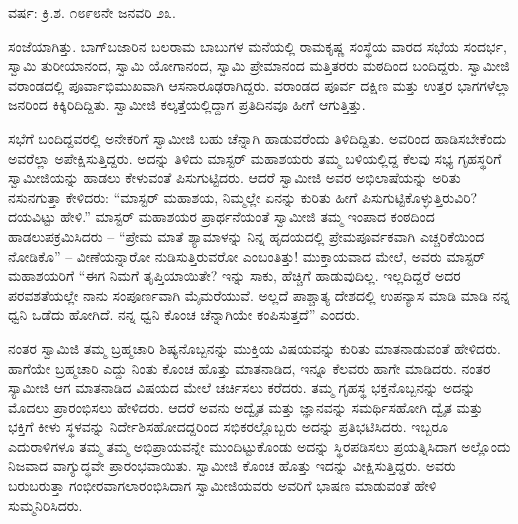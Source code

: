 \begin{center}
ವರ್ಷ: ಕ್ರಿ.ಶ. ೧೮೯೮ನೇ ಜನವರಿ ೨೩.
\end{center}

ಸಂಜೆಯಾಗಿತ್ತು. ಬಾಗ್‌ಬಜಾರಿನ ಬಲರಾಮ ಬಾಬುಗಳ ಮನೆಯಲ್ಲಿ ರಾಮಕೃಷ್ಣ ಸಂಸ್ಥೆಯ ವಾರದ ಸಭೆಯ ಸಂದರ್ಭ, ಸ್ವಾಮಿ ತುರೀಯಾನಂದ, ಸ್ವಾಮಿ ಯೋಗಾನಂದ, ಸ್ವಾಮಿ ಪ್ರೇಮಾನಂದ ಮತ್ತಿತರರು ಮಠದಿಂದ ಬಂದಿದ್ದರು. ಸ್ವಾಮೀಜಿ ವರಾಂಡದಲ್ಲಿ ಪೂರ್ವಾಭಿಮುಖವಾಗಿ ಆಸನಾರೂಢರಾಗಿದ್ದರು. ವರಾಂಡದ ಪೂರ್ವ ದಕ್ಷಿಣ ಮತ್ತು ಉತ್ತರ ಭಾಗಗಳೆಲ್ಲಾ ಜನರಿಂದ ಕಿಕ್ಕಿರಿದಿದ್ದಿತು. ಸ್ವಾಮೀಜಿ ಕಲ್ಕತ್ತೆಯಲ್ಲಿದ್ದಾಗ ಪ್ರತಿದಿನವೂ ಹೀಗೆ ಆಗುತ್ತಿತ್ತು.


ಸಭೆಗೆ ಬಂದಿದ್ದವರಲ್ಲಿ ಅನೇಕರಿಗೆ ಸ್ವಾಮೀಜಿ ಬಹು ಚೆನ್ನಾಗಿ ಹಾಡುವರೆಂದು ತಿಳಿದಿದ್ದಿತು. ಅವರಿಂದ ಹಾಡಿಸಬೇಕೆಂದು ಅವರೆಲ್ಲಾ ಅಪೇಕ್ಷಿಸುತ್ತಿದ್ದರು. ಅದನ್ನು ತಿಳಿದು ಮಾಸ್ಟರ್ ಮಹಾಶಯರು ತಮ್ಮ ಬಳಿಯಲ್ಲಿದ್ದ ಕೆಲವು ಸಭ್ಯ ಗೃಹಸ್ಥರಿಗೆ ಸ್ವಾಮೀಜಿಯನ್ನು ಹಾಡಲು ಕೇಳುವಂತೆ ಪಿಸುಗುಟ್ಟಿದರು. ಆದರೆ ಸ್ವಾಮೀಜಿ ಅವರ ಅಭಿಲಾಷೆಯನ್ನು ಅರಿತು ನಸುನಗುತ್ತಾ ಕೇಳಿದರು: “ಮಾಸ್ಟರ್ ಮಹಾಶಯ, ನಿಮ್ಮಲ್ಲೇ ಏನನ್ನು ಕುರಿತು ಹೀಗೆ ಪಿಸುಗುಟ್ಟಿಕೊಳ್ಳುತ್ತಿರುವಿರಿ? ದಯವಿಟ್ಟು ಹೇಳಿ.” ಮಾಸ್ಟರ್ ಮಹಾಶಯರ ಪ್ರಾರ್ಥನೆಯಂತೆ ಸ್ವಾಮೀಜಿ ತಮ್ಮ ಇಂಪಾದ ಕಂಠದಿಂದ ಹಾಡಲುಪಕ್ರಮಿಸಿದರು – “ಪ್ರೇಮ ಮಾತೆ ಶ್ಯಾಮಾಳನ್ನು ನಿನ್ನ ಹೃದಯದಲ್ಲಿ ಪ್ರೇಮಪೂರ್ವಕವಾಗಿ ಎಚ್ಚರಿಕೆಯಿಂದ ನೋಡಿಕೊ” – ವೀಣೆಯನ್ನಾರೋ ನುಡಿಸುತ್ತಿರುವರೋ ಎಂಬಂತಿತ್ತು! ಮುಕ್ತಾಯವಾದ ಮೇಲೆ, ಅವರು ಮಾಸ್ಟರ್ ಮಹಾಶಯರಿಗೆ “ಈಗ ನಿಮಗೆ ತೃಪ್ತಿಯಾಯಿತೇ? ಇನ್ನು ಸಾಕು, ಹೆಚ್ಚಿಗೆ ಹಾಡುವುದಿಲ್ಲ. ಇಲ್ಲದಿದ್ದರೆ ಅದರ ಪರವಶತೆಯಲ್ಲೇ ನಾನು ಸಂಪೂರ್ಣವಾಗಿ ಮೈಮರೆಯುವೆ. ಅಲ್ಲದೆ ಪಾಶ್ಚಾತ್ಯ ದೇಶದಲ್ಲಿ ಉಪನ್ಯಾಸ ಮಾಡಿ ಮಾಡಿ ನನ್ನ ಧ್ವನಿ ಒಡೆದು ಹೋಗಿದೆ. ನನ್ನ ಧ್ವನಿ ಕೊಂಚ ಚೆನ್ನಾಗಿಯೇ ಕಂಪಿಸುತ್ತದೆ” ಎಂದರು.

ನಂತರ ಸ್ವಾಮಿಜಿ ತಮ್ಮ ಬ್ರಹ್ಮಚಾರಿ ಶಿಷ್ಯನೊಬ್ಬನನ್ನು ಮುಕ್ತಿಯ ವಿಷಯವನ್ನು ಕುರಿತು ಮಾತನಾಡುವಂತೆ ಹೇಳಿದರು. ಹಾಗೆಯೇ ಬ್ರಹ್ಮಚಾರಿ ಎದ್ದು ನಿಂತು ಕೊಂಚ ಹೊತ್ತು ಮಾತನಾಡಿದ, ಇನ್ನೂ ಕೆಲವರು ಹಾಗೇ ಮಾಡಿದರು. ನಂತರ ಸ್ಯಾಮೀಜಿ ಆಗ ಮಾತನಾಡಿದ ವಿಷಯದ ಮೇಲೆ ಚರ್ಚಿಸಲು ಕರೆದರು. ತಮ್ಮ ಗೃಹಸ್ಥ ಭಕ್ತನೊಬ್ಬನನ್ನು ಅದನ್ನು ಮೊದಲು ಪ್ರಾರಂಭಿಸಲು ಹೇಳಿದರು. ಆದರೆ ಅವನು ಅದ್ವೈತ ಮತ್ತು ಜ್ಞಾನವನ್ನು ಸಮರ್ಥಿಸಹೋಗಿ ದ್ವೈತ ಮತ್ತು ಭಕ್ತಿಗೆ ಕೀಳು ಸ್ಥಳವನ್ನು ನಿರ್ದೇಶಿಸಹೋದದ್ದರಿಂದ ಸಭಿಕರಲ್ಲೊಬ್ಬರು ಅದನ್ನು ಪ್ರತಿಭಟಿಸಿದರು. ಇಬ್ಬರೂ ಎದುರಾಳಿಗಳೂ ತಮ್ಮ ತಮ್ಮ ಅಭಿಪ್ರಾಯವನ್ನೇ ಮುಂದಿಟ್ಟುಕೊಂಡು ಅದನ್ನು ಸ್ಥಿರಪಡಿಸಲು ಪ್ರಯತ್ನಿಸಿದಾಗ ಅಲ್ಲೊಂದು ನಿಜವಾದ ವಾಗ್ಯುದ್ಧವೇ ಪ್ರಾರಂಭವಾಯಿತು. ಸ್ವಾಮೀಜಿ ಕೊಂಚ ಹೊತ್ತು ಇದನ್ನು ವೀಕ್ಷಿಸುತ್ತಿದ್ದರು. ಅವರು ಬರುಬರುತ್ತಾ ಗಂಭೀರವಾಗಲಾರಂಭಿಸಿದಾಗ ಸ್ವಾಮೀಜಿಯವರು ಅವರಿಗೆ ಭಾಷಣ ಮಾಡುವಂತೆ ಹೇಳಿ ಸುಮ್ಮನಿರಿಸಿದರು.

